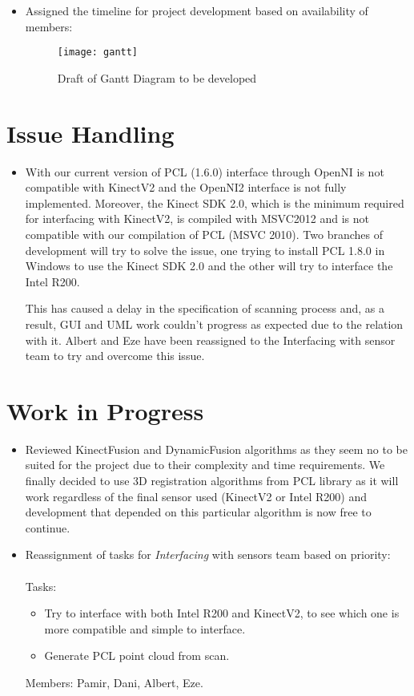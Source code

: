 \documentclass[11pt]{article} %
\begin{document}
\begin{itemize}
	\item Assigned the timeline for project development based on availability of members:
	\begin{figure}[h]
		\centering
		\texttt{[image: gantt]}
		\caption{Draft of Gantt Diagram to be developed}
	\end{figure}
	
\end{itemize}

\section{Issue Handling}
\begin{itemize}	
	\item With our current version of PCL (1.6.0) interface through OpenNI is not compatible with KinectV2 and the OpenNI2 interface is not fully implemented. Moreover, the Kinect SDK 2.0, which is the minimum required for interfacing with KinectV2, is compiled with MSVC2012 and is not compatible with our compilation of PCL (MSVC 2010). Two branches of development will try to solve the issue, one trying to install PCL 1.8.0 in Windows to use the Kinect SDK 2.0 and the other will try to interface the Intel R200.

	This has caused a delay in the specification of scanning process and, as a result, GUI and UML work couldn't progress as expected due to the relation with it. Albert and Eze have been reassigned to the Interfacing with sensor team to try and overcome this issue.
\end{itemize}

\section{Work in Progress}

\begin{itemize}
	\item Reviewed KinectFusion and DynamicFusion algorithms  as they seem no to be suited for the project due to their complexity and time requirements. We finally decided to use 3D registration algorithms from PCL library as it will work regardless of the final sensor used (KinectV2 or Intel R200) and development that depended on this particular algorithm is now free to continue.	
		
	\item Reassignment of tasks for \emph{Interfacing} with sensors team based on priority:\\
		~\\Tasks:
		\begin{itemize}
			\item Try to interface with both Intel R200 and KinectV2, to see which one is more compatible and simple to interface.
			\item  Generate PCL point cloud from scan.
		\end{itemize}
		Members: Pamir, Dani, Albert, Eze. 
		
\end{itemize}
\end{document}

